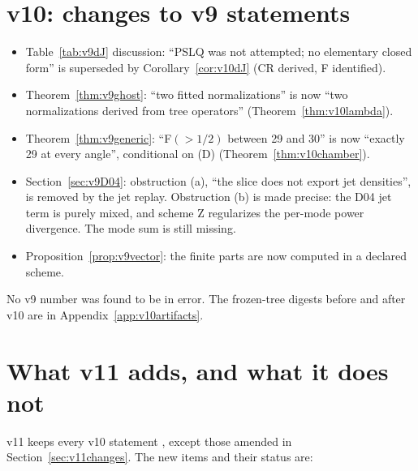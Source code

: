 \documentclass[11pt,a4paper]{article}
\theoremstyle{plain}
\theoremstyle{definition}
\theoremstyle{remark}
\numberwithin{equation}{section}
\begin{document}
\section{v10: changes to v9 statements}
\label{sec:v10changes}
\begin{itemize}
\item Table~\ref{tab:v9dJ} discussion: ``PSLQ was not attempted;
no elementary closed form'' is superseded by
Corollary~\ref{cor:v10dJ} (CR derived, F identified).
\item Theorem~\ref{thm:v9ghost}: ``two fitted normalizations'' is
now ``two normalizations derived from tree operators''
(Theorem~\ref{thm:v10lambda}).
\item Theorem~\ref{thm:v9generic}: ``F\((>1/2)\) between 29 and 30''
is now ``exactly 29 at every angle'', conditional on (D)
(Theorem~\ref{thm:v10chamber}).
\item Section~\ref{sec:v9D04}: obstruction (a), ``the slice does not
export jet densities'', is removed by the jet replay. Obstruction
(b) is made precise: the D04 jet term is purely mixed, and scheme Z
regularizes the per-mode power divergence. The mode sum is still
missing.
\item Proposition~\ref{prop:v9vector}: the finite parts are now
computed in a declared scheme.
\end{itemize}
No v9 number was found to be in error. The frozen-tree digests
before and after v10 are in Appendix~\ref{app:v10artifacts}.

\section{What v11 adds, and what it does not}
\label{sec:whatv11}

v11 keeps every v10 statement \cite{CheungConeV10}, except those
amended in Section~\ref{sec:v11changes}. The new items and their
status are:
\end{document}
